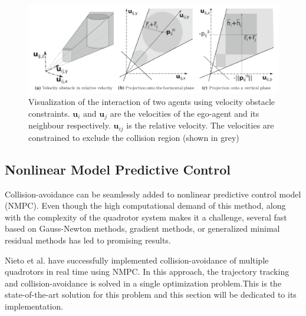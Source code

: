 \begin{figure}
\centering
\includegraphics[width=\textwidth]{./images/velocity_obstacle.png}
\caption[Collision avoidance of a neighbouring agent using the principle of velocity obstacles]{Visualization of the interaction of two agents using velocity obstacle constraints. $\textbf{u}_i$ and $\textbf{u}_j$ are the velocities of the ego-agent and its neighbour respectively. $\textbf{u}_{ij}$ is the relative velocity. The velocities are constrained to exclude the collision region (shown in grey) \cite{alonso2015collision}}
\label{fig:vel_obs}
\end{figure}

\subsection{Nonlinear Model Predictive Control}
Collision-avoidance can be seamlessly added to nonlinear predictive control model (NMPC). Even though the high computational demand of this method, along with the complexity of the quadrotor system makes it a challenge, several fast based on Gauss-Newton methods, gradient methods, or generalized minimal residual methods has led to promising results.

Nieto et al. \cite{kamel2017robust} have successfully implemented collision-avoidance of multiple quadrotors in real time using NMPC. In this approach, the trajectory tracking and collision-avoidance is solved in a single optimization problem.This is the state-of-the-art solution for this problem and this section will be dedicated to its implementation. 

